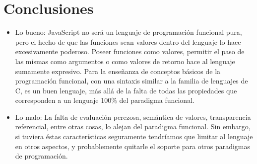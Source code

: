 \section{Conclusiones}

\begin{itemize}
\item Lo bueno: 
JavaScript no será un lenguaje de programación funcional pura, pero el hecho de que las funciones sean valores dentro del lenguaje lo hace excesivamente poderoso. Poseer funciones como valores, permitir el paso de las mismas como argumentos o como valores de retorno hace al lenguaje sumamente expresivo.
Para la enseñanza de conceptos básicos de la programación funcional, con una sintaxis similar a la familia de lenguajes de C, es un buen lenguaje, más allá de la falta de todas las propiedades que corresponden a un lenguaje 100\% del paradigma funcional.
\item Lo malo: 
La falta de evaluación perezosa, semántica de valores, transparencia referencial, entre otras cosas, lo alejan del paradigma funcional. Sin embargo, si tuviera éstas características seguramente tendríamos que limitar al lenguaje en otros aspectos, y probablemente quitarle el soporte para otros paradigmas de programación. 
\end{itemize}
